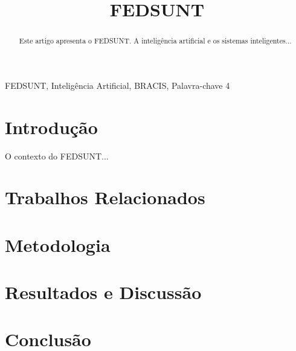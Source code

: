 \documentclass[10pt, conference]{IEEEtran}
\begin{document}
\title{FEDSUNT\\
}

\author{
}

\maketitle

\begin{abstract}
Este artigo apresenta o FEDSUNT. 
A inteligência artificial e os sistemas inteligentes...
\end{abstract}

\begin{IEEEkeywords}
FEDSUNT, Inteligência Artificial, BRACIS, Palavra-chave 4
\end{IEEEkeywords}

\section{Introdução}
O contexto do FEDSUNT...

\section{Trabalhos Relacionados}

\section{Metodologia}

\section{Resultados e Discussão}

\section{Conclusão}


% 
\end{document}
